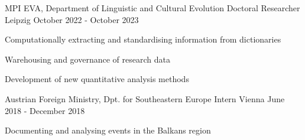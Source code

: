 \begin{cventries}

  \cventry
    {MPI EVA, Department of Linguistic and Cultural Evolution} %
    {Doctoral Researcher} %
    {Leipzig} %
    {October 2022 - October 2023} %
    {
      \begin{cvitems} %
      \item{Computationally extracting and standardising information from dictionaries}
      \item{Warehousing and governance of research data}
      \item{Development of new quantitative analysis methods}
      \end{cvitems}
    }
    
  \cventry
    {Austrian Foreign Ministry, Dpt. for Southeastern Europe} %
    {Intern} %
    {Vienna} %
    {June 2018 - December 2018} %
    {
      \begin{cvitems} %
        \item{Documenting and analysing events in the Balkans region}
      \end{cvitems}
    }

    
\end{cventries}


